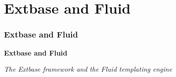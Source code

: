 %

\section{Extbase and Fluid}
\begin{frame}[fragile]
	\frametitle{Extbase and Fluid}

	\begin{center}\huge{\color{typo3darkgrey}\textbf{Extbase and Fluid}}\end{center}
	\begin{center}\large{\textit{The Extbase framework and the Fluid templating engine}}\end{center}

\end{frame}

